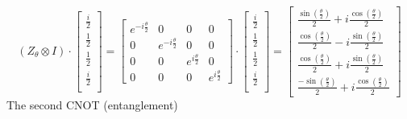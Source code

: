 \documentclass{article}
\begin{document}
\[
	(Z_\theta \otimes I) \cdot \begin{bmatrix}
		\frac{i}{2} \\
		\frac{1}{2} \\
		\frac{1}{2} \\
		\frac{i}{2} \\
	\end{bmatrix} =
	\begin{bmatrix}
		e^{-i \frac{\theta}{2}} & 0                       & 0                      & 0                      \\
		0                       & e^{-i \frac{\theta}{2}} & 0                      & 0                      \\
		0                       & 0                       & e^{i \frac{\theta}{2}} & 0                      \\
		0                       & 0                       & 0                      & e^{i \frac{\theta}{2}}
	\end{bmatrix}
	\cdot
	\begin{bmatrix}
		\frac{i}{2} \\
		\frac{1}{2} \\
		\frac{1}{2} \\
		\frac{i}{2} \\
	\end{bmatrix} =
	\begin{bmatrix}
		\frac{\sin \left(\frac{\theta}{2}\right)}{2} + i \frac{\cos \left(\frac{\theta}{2}\right)}{2} \\
		\frac{\cos \left(\frac{\theta}{2}\right)}{2} - i \frac{\sin \left(\frac{\theta}{2}\right)}{2} \\
		\frac{\cos \left(\frac{\theta}{2}\right)}{2} + i \frac{\sin \left(\frac{\theta}{2}\right)}{2} \\
		\frac{-\sin \left(\frac{\theta}{2}\right)}{2} + i \frac{\cos \left(\frac{\theta}{2}\right)}{2}
	\end{bmatrix}
\]
The second CNOT (entanglement)
\end{document}
